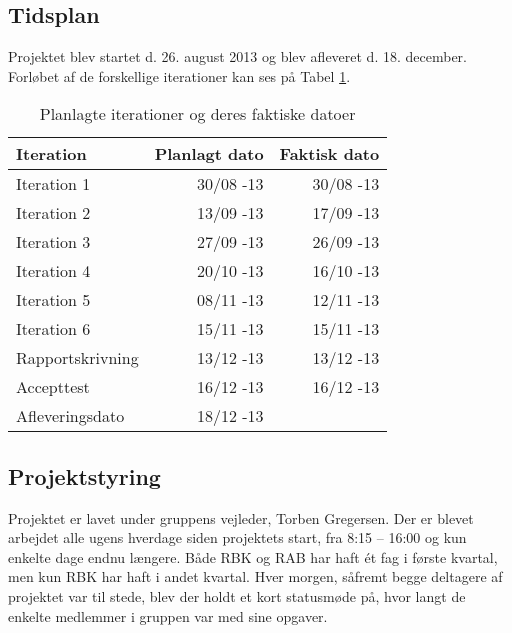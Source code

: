 \documentclass[Main]{subfiles}
\begin{document}
\subsection{Tidsplan}
Projektet blev startet d. 26. august 2013 og blev afleveret d. 18. december.
Forløbet af de forskellige iterationer kan ses på Tabel \ref{Tab:Tidsplan}.

\begin{table}[H]
\centering
	\begin{tabular}{l r r}
	\hline
	\textbf{Iteration} & \textbf{Planlagt dato} & \textbf{Faktisk dato} \\ \hline
	Iteration 1 & 30/08 -13 & 30/08 -13\\
	Iteration 2 & 13/09 -13 & 17/09 -13\\
	Iteration 3 & 27/09 -13 & 26/09 -13\\
	Iteration 4 & 20/10 -13 & 16/10 -13\\
	Iteration 5 & 08/11 -13 & 12/11 -13\\
	Iteration 6 & 15/11 -13 & 15/11 -13\\
	Rapportskrivning & 13/12 -13 & 13/12 -13 \\
	Accepttest	& 16/12 -13 & 16/12 -13\\
	Afleveringsdato & 18/12 -13 & 
	\\ \hline
	\end{tabular}
\caption{Planlagte iterationer og deres faktiske datoer}
\label{Tab:Tidsplan}
\end{table}


\subsection{Projektstyring}
Projektet er lavet under gruppens vejleder, Torben Gregersen.
Der er blevet arbejdet alle ugens hverdage siden projektets start, fra 8:15 -- 16:00 og kun enkelte dage endnu længere.
Både RBK og RAB har haft ét fag i første kvartal, men kun RBK har haft i andet kvartal.
Hver morgen, såfremt begge deltagere af projektet var til stede, blev der holdt et kort statusmøde på, hvor langt de enkelte medlemmer i gruppen var med sine opgaver.
\end{document}
